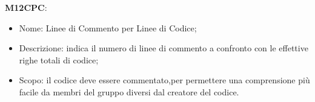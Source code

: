     \textbf{M12CPC}:
    \begin{itemize}
      \item Nome: Linee di Commento per Linee di Codice;
      \item Descrizione: indica il numero di linee di commento a confronto con le effettive righe totali di codice;
      \item Scopo: il codice deve essere commentato,per permettere una comprensione più facile da membri del gruppo diversi dal creatore del codice.
    \end{itemize}

			